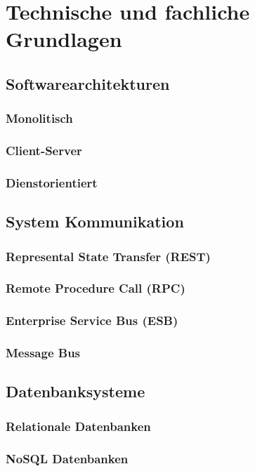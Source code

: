 \section{Technische und fachliche Grundlagen} 
\label{ch:grundlagen} 

\subsection{Softwarearchitekturen}
	\subsubsection{Monolitisch}
	\subsubsection{Client-Server}
	\subsubsection{Dienstorientiert}

\subsection{System Kommunikation}
	\subsubsection{Represental State Transfer (REST)}
	\subsubsection{Remote Procedure Call (RPC)}
	\subsubsection{Enterprise Service Bus (ESB)}
	\subsubsection{Message Bus}

\subsection{Datenbanksysteme}
	\subsubsection{Relationale Datenbanken}
	\subsubsection{NoSQL Datenbanken}

